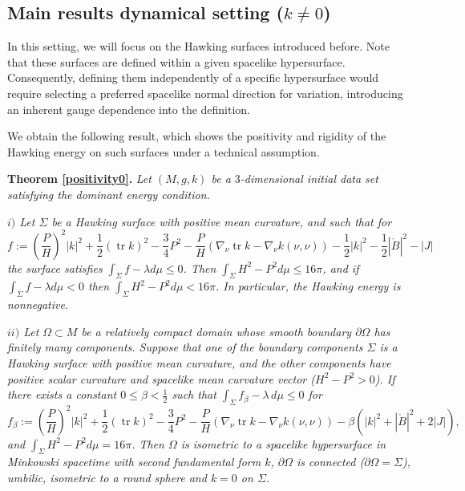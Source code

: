 \documentclass[12pt,a4paper]{amsart}
\theoremstyle{plain}
\theoremstyle{definition}
\newcommand{\tr}{\operatorname{tr}}
\begin{document}
\subsection{Main results dynamical setting (\texorpdfstring{$k\neq 0$}))}



In this setting, we will focus on the Hawking surfaces introduced before. Note that these surfaces are defined within a given spacelike hypersurface. Consequently, defining them independently of a specific hypersurface would require selecting a preferred spacelike normal direction for variation, introducing an inherent gauge dependence into the definition.



We obtain the following result, which shows the positivity and rigidity of the Hawking energy on such surfaces under a technical assumption.





\noindent\textbf{Theorem \ref{positivity0}.} \emph{Let $(M,g,k)$ be a $3$-dimensional initial data set satisfying the dominant energy condition.}
    
    \emph{$i)$ Let $\Sigma$ be a Hawking surface with positive mean curvature, and such that for} 
    \begin{equation*}
        f:= \left( \frac{P}{H}\right)^2|k|^2+ \frac{1}{2 }(\tr k)^2    - \frac{3}{4} P^2- \frac{P}{H}( \nabla_\nu \tr k - \nabla_\nu k(\nu,\nu )) -  \frac{1}{2} |k|^2  -\frac{1}{2} |\mathring{B}|^2 -|J|
    \end{equation*}
    \emph{the surface satisfies $\int_\Sigma f -\lambda d\mu \leq 0$. Then $\int_\Sigma H^2 -P^2 d\mu \leq 16\pi $, and  if $\int_\Sigma f -\lambda d\mu < 0$ then  $\int_\Sigma H^2 -P^2 d\mu < 16\pi $. In particular, the Hawking energy is nonnegative.}


 \emph{$ii)$ Let  $\Omega \subset M$ be a relatively compact domain whose smooth boundary  $\partial \Omega $  has finitely many components. Suppose that one of the boundary components $\Sigma$ is a Hawking surface with positive mean curvature, and the other components have positive scalar curvature and spacelike mean curvature vector ($H^2-P^2>0$). If   there exists a constant $0\leq\beta <\frac{1}{2}$ such that $\int_\Sigma f_\beta -\lambda \, d\mu \leq 0$  for} 
 \begin{equation*}
        f_\beta:= \left( \frac{P}{H}\right)^2|k|^2+ \frac{1}{2 }(\tr k)^2   - \frac{3}{4} P^2- \frac{P}{H}( \nabla_\nu \tr k - \nabla_\nu k(\nu,\nu ))  -  \beta( |k|^2 + |\mathring{B}|^2 +2|J|),
    \end{equation*}
\emph{and  $\int_\Sigma H^2 -P^2 d\mu = 16\pi $. Then   $\Omega$ is isometric to a spacelike hypersurface in Minkowski spacetime with second fundamental form  $k$,   $\partial \Omega$ is connected ($ \partial \Omega=\Sigma $), umbilic, isometric to a round sphere and $k=0$ on $\Sigma$.}
\end{document}
